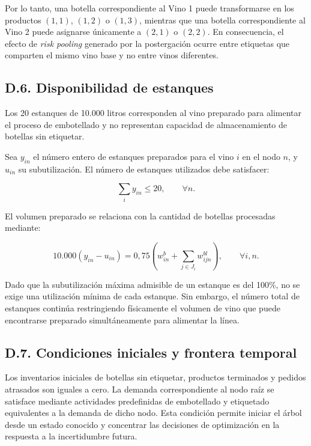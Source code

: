 Por lo tanto, una botella correspondiente al Vino 1 puede transformarse en los
productos $(1,1)$, $(1,2)$ o $(1,3)$, mientras que una botella correspondiente
al Vino 2 puede asignarse únicamente a $(2,1)$ o $(2,2)$. En consecuencia, el
efecto de \textit{risk pooling} generado por la postergación ocurre entre
etiquetas que comparten el mismo vino base y no entre vinos diferentes.


\subsection*{D.6. Disponibilidad de estanques}

Los 20 estanques de 10.000 litros corresponden al vino preparado para alimentar
el proceso de embotellado y no representan capacidad de almacenamiento de
botellas sin etiquetar.

Sea $y_{in}$ el número entero de estanques preparados para el vino $i$ en el
nodo $n$, y $u_{in}$ su subutilización. El número de estanques utilizados debe
satisfacer:

\begin{equation}
    \sum_i y_{in}
    \leq
    20,
    \qquad \forall n.
    \label{eq:anexoD-numero-estanques}
\end{equation}

El volumen preparado se relaciona con la cantidad de botellas procesadas
mediante:

\begin{equation}
    10.000
    \left(
        y_{in}-u_{in}
    \right)
    =
    0{,}75
    \left(
        w^{b}_{in}
        +
        \sum_{j\in J_i} w^{bl}_{ijn}
    \right),
    \qquad \forall i,n.
    \label{eq:anexoD-balance-estanques}
\end{equation}

Dado que la subutilización máxima admisible de un estanque es del 100\%, no se
exige una utilización mínima de cada estanque. Sin embargo, el número total de
estanques continúa restringiendo físicamente el volumen de vino que puede
encontrarse preparado simultáneamente para alimentar la línea.


\subsection*{D.7. Condiciones iniciales y frontera temporal}

Los inventarios iniciales de botellas sin etiquetar, productos terminados y
pedidos atrasados son iguales a cero. La demanda correspondiente al nodo raíz
se satisface mediante actividades predefinidas de embotellado y etiquetado
equivalentes a la demanda de dicho nodo. Esta condición permite iniciar el
árbol desde un estado conocido y concentrar las decisiones de optimización en
la respuesta a la incertidumbre futura.

